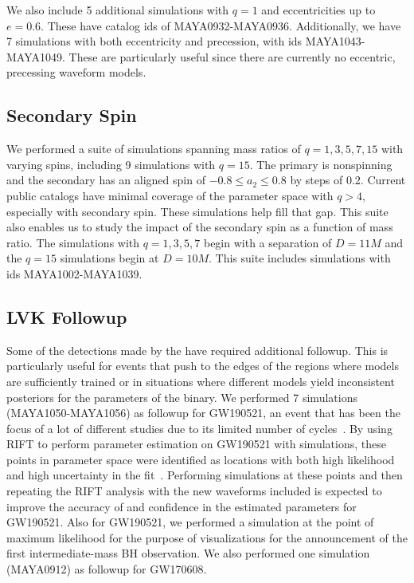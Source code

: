 \documentclass[
twocolumn,prd,
showpacs,
nofootinbib,
amsmath,amssymb,
superscriptaddress]{revtex4-1}
\begin{document}
We also include 5 additional simulations with $q=1$ and eccentricities up to $e=0.6$.
These have catalog ids of MAYA0932-MAYA0936.
Additionally, we have 7 simulations with both eccentricity and precession, with ids MAYA1043-MAYA1049.
These are particularly useful since there are currently no eccentric, precessing waveform models.

\subsection{Secondary Spin}\label{sec:high_mass_ratio}
We performed a suite of simulations spanning mass ratios of $q=1, 3, 5, 7, 15$ with varying spins, including 9 simulations with $q=15$.
The primary \bh{} is nonspinning and the secondary \bh{} has an aligned spin of $-0.8 \le a_2 \le 0.8$ by steps of 0.2.
Current public \nr{} catalogs have minimal coverage of the parameter space with $q > 4$, especially with secondary spin.
These simulations help fill that gap.
This suite also enables us to study the impact of the secondary spin as a function of mass ratio. 
The simulations with $q=1, 3, 5, 7$ begin with a separation of $D=11M$ and the $q=15$ simulations begin at $D=10M$.
This suite includes simulations with ids MAYA1002-MAYA1039.

\subsection{LVK Followup}\label{sec:lvk_followup}
Some of the detections made by the \lvk{} have required additional \nr{} followup.
This is particularly useful for events that push to the edges of the regions where models are sufficiently trained or in situations where different models yield inconsistent posteriors for the parameters of the binary.
We performed 7 simulations (MAYA1050-MAYA1056) as followup for GW190521, an event that has been the focus of a lot of different studies due to its limited number of cycles~\cite{Gayathri:2020coq,Romero-Shaw:2021ual, LIGOScientific:2020iuh, Gamba:2021gap, CalderonBustillo:2020fyi}.
By using RIFT to perform parameter estimation on GW190521 with \nr{} simulations, these points in parameter space were identified as locations with both high likelihood and high uncertainty in the fit~\cite{Lange:2017wki}. 
Performing simulations at these points and then repeating the RIFT analysis with the new waveforms included is expected to improve the accuracy of and confidence in the estimated parameters for GW190521.
Also for GW190521, we performed a simulation at the point of maximum likelihood for the purpose of visualizations for the announcement of the first intermediate-mass BH observation.
We also performed one simulation (MAYA0912) as followup for GW170608.
\end{document}
